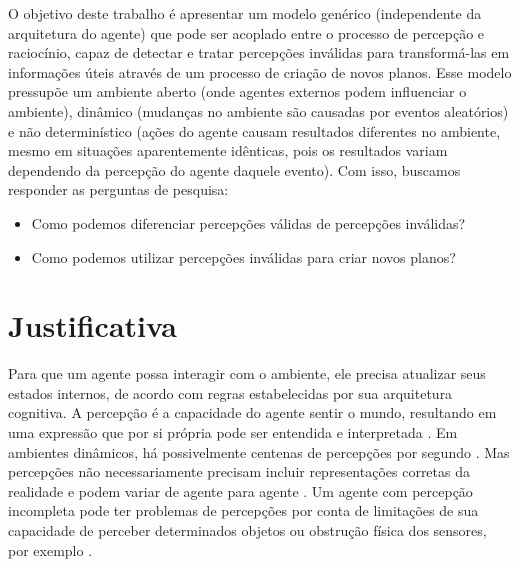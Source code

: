 O objetivo deste trabalho é apresentar um modelo genérico (independente da arquitetura do agente) que pode ser acoplado entre o processo de percepção e raciocínio, capaz de detectar e tratar percepções inválidas para transformá-las em informações úteis através de um processo de criação de novos planos. Esse modelo pressupõe um ambiente aberto (onde agentes externos podem influenciar o ambiente), dinâmico (mudanças no ambiente são causadas por eventos aleatórios) e não determinístico (ações do agente causam resultados diferentes no ambiente, mesmo em situações aparentemente idênticas, pois os resultados variam dependendo da percepção do agente daquele evento).  Com isso, buscamos responder as perguntas de pesquisa:

\begin{itemize}
    \item Como podemos diferenciar percepções válidas de percepções inválidas?
    \item Como podemos utilizar percepções inválidas para criar novos planos?
\end{itemize}

\iffalse

Agentes são baseados em arquiteturas cognitivas, \emph{frameworks} criados para simular a cognição humana \cite{newell1994unified}.

Um exemplo de arquitetura cognitiva é o modelo \emph{belief-desire-intention} (BDI), originado na psicologia com a teoria do raciocínio prático de Bratman \cite{bratman1987intention}, posteriormente implementado como um modelo computacional por Rao \cite{rao1995bdi}. No BDI, os estados internos do agente são divididos em crenças, desejos e intenções. Crenças são todo o conhecimento que o agente possui a respeito do mundo, recebidos da percepção do ambiente e de comunicações com outros agentes ou outras fontes externas. Desejos são as mudanças que o agente deseja causar no mundo, e as intenções representam os estados deliberativos do agente, ou seja, coisas que o agente efetivamente se dispôs a fazer.



\fi


\section{Justificativa}

Para que um agente possa interagir com o ambiente, ele precisa atualizar seus estados internos, de acordo com regras estabelecidas por sua arquitetura cognitiva. A percepção é a capacidade do agente sentir o mundo, resultando em uma expressão que por si própria pode ser entendida e interpretada \cite{wyens2004}. Em ambientes dinâmicos, há possivelmente centenas de percepções por segundo \cite{hayes1992guardian}. Mas percepções não necessariamente precisam incluir representações corretas da realidade e podem variar de agente para agente \cite{janssen2005agent}. Um agente com percepção incompleta pode ter problemas de percepções por conta de limitações de sua capacidade de perceber determinados objetos ou obstrução física dos sensores, por exemplo \cite{chrisman1991intelligent}. 

